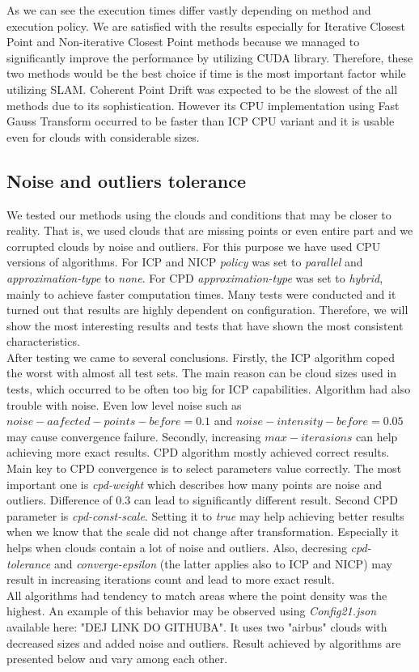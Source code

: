 \documentclass[titlepage]{article}
\begin{document}
As we can see the execution times differ vastly depending on method and execution policy. We are satisfied with the results especially for Iterative Closest Point and Non-iterative Closest Point methods because we managed to significantly improve the performance by utilizing CUDA library. Therefore, these two methods would be the best choice if time is the most important factor while utilizing SLAM. Coherent Point Drift was expected to be the slowest of the all methods due to its sophistication. However its CPU implementation using Fast Gauss Transform occurred to be faster than ICP CPU variant and it is usable even for clouds with considerable sizes.

\subsection{Noise and outliers tolerance}
We tested our methods using the clouds and conditions that may be closer to reality. That is, we used clouds that are missing points or even entire part and we corrupted clouds by noise and outliers. For this purpose we have used CPU versions of algorithms. For ICP and NICP \textit{policy} was set to \textit{parallel} and \textit{approximation-type} to \textit{none}. For CPD \textit{approximation-type} was set to \textit{hybrid}, mainly to achieve faster computation times. Many tests were conducted and it turned out that results are highly dependent on configuration. Therefore, we will show the most interesting results and tests that have shown the most consistent characteristics.\\
After testing we came to several conclusions. Firstly, the ICP algorithm coped the worst with almost all test sets. The main reason can be cloud sizes used in tests, which occurred to be often too big for ICP capabilities. Algorithm had also trouble with noise. Even low level noise such as $noise-aafected-points-before=0.1$ and $noise-intensity-before=0.05$ may cause convergence failure. Secondly, increasing $max-iterasions$ can help achieving more exact results. CPD algorithm mostly achieved correct results. Main key to CPD convergence is to select parameters value correctly. The most important one is \textit{cpd-weight} which describes how many points 
are noise and outliers. Difference of $0.3$ can lead to significantly different result. Second CPD parameter is \textit{cpd-const-scale}. Setting it to \textit{true} may help achieving better results when we know that the scale did not change after transformation. Especially it helps when clouds contain a lot of noise and outliers. Also, decresing \textit{cpd-tolerance} and \textit{converge-epsilon} (the latter applies also to ICP and NICP) may result in increasing iterations count and lead to more exact result.\\
All algorithms had tendency to match areas where the point density was the highest. An example of this behavior may be observed using \textit{Config21.json} available here: "DEJ LINK DO GITHUBA". It uses two "airbus" clouds with decreased sizes and added noise and outliers. Result achieved by algorithms are presented below and vary among each other.
\end{document}
